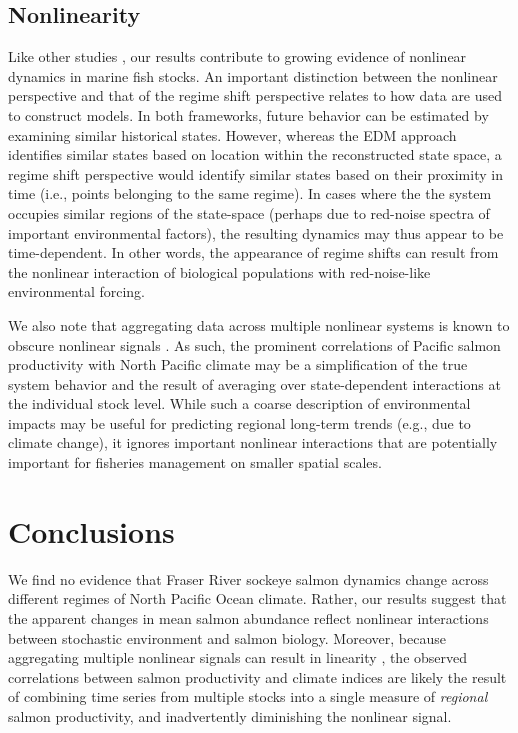 \subsection{Nonlinearity}

Like other studies \cite{Hsieh_2005, Glaser_2014}, our results contribute to growing evidence of nonlinear dynamics in marine fish stocks. An important distinction between the nonlinear perspective and that of the regime shift perspective relates to how data are used to construct models. In both frameworks, future behavior can be estimated by examining similar historical states. However, whereas the EDM approach identifies similar states based on location within the reconstructed state space, a regime shift perspective would identify similar states based on their proximity in time (i.e., points belonging to the same regime). In cases where the the system occupies similar regions of the state-space (perhaps due to red-noise spectra of important environmental factors), the resulting dynamics may thus appear to be time-dependent. In other words, the appearance of regime shifts can result from the nonlinear interaction of biological populations with red-noise-like environmental forcing.

We also note that aggregating data across multiple nonlinear systems is known to obscure nonlinear signals \cite{Sugihara_1994}. As such, the prominent correlations of Pacific salmon productivity with North Pacific climate \cite{Mantua_1997, Beamish_1997} may be a simplification of the true system behavior and the result of averaging over state-dependent interactions at the individual stock level. While such a coarse description of environmental impacts may be useful for predicting regional long-term trends (e.g., due to climate change), it ignores important nonlinear interactions that are potentially important for fisheries management on smaller spatial scales.

\section{Conclusions}

We find no evidence that Fraser River sockeye salmon dynamics change across different regimes of North Pacific Ocean climate. Rather, our results suggest that the apparent changes in mean salmon abundance reflect nonlinear interactions between stochastic environment and salmon biology. Moreover, because aggregating multiple nonlinear signals can result in linearity \cite{Sugihara_1994}, the observed correlations between salmon productivity and climate indices \cite{Mantua_1997, Beamish_1997} are likely the result of combining time series from multiple stocks into a single measure of \emph{regional} salmon productivity, and inadvertently diminishing the nonlinear signal.

